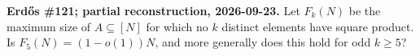\textbf{Erd\H{o}s \#121; partial reconstruction, 2026-09-23.}
Let $F_k(N)$ be the maximum size of $A\subseteq[N]$ for which no $k$
distinct elements have square product. Is $F_5(N)=(1-o(1))N$, and more
generally does this hold for odd $k\ge5$?
